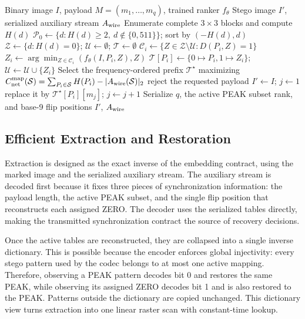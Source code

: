 \begin{algorithm*}[t]
\caption{Net-Aware CNN-Ranked Distance-One Embedding}
\label{alg:embedding}
\begin{algorithmic}[1]
\Require Binary image $I$, payload $M=(m_1,\ldots,m_q)$, trained ranker $f_\theta$
\Ensure Stego image $I'$, serialized auxiliary stream $A_{\rm wire}$
\State Enumerate complete $3\times3$ blocks and compute $H(d)$
\State $\mathcal P_0\gets\{d:H(d)\ge2,\ d\notin\{0,511\}\}$; sort by $(-H(d),d)$
\State $\mathcal Z\gets\{d:H(d)=0\}$; $\mathcal U\gets\emptyset$; $\mathcal T\gets\emptyset$
    \State $\mathcal C_i\gets\{Z\in\mathcal Z\setminus\mathcal U:D(P_i,Z)=1\}$
        \State $Z_i\gets\arg\min_{Z\in\mathcal C_i}(f_\theta(I,P_i,Z),Z)$
        \State $\mathcal T[P_i]\gets\{0\mapsto P_i,1\mapsto Z_i\}$;
        $\mathcal U\gets\mathcal U\cup\{Z_i\}$
    \EndIf
\EndFor
\State Select the frequency-ordered prefix $\mathcal T^\star$ maximizing
\RevisionAddBegin
$C_{\rm net}^{\rm map}(\mathcal S)=
\sum_{P_i\in\mathcal S}H(P_i)-|A_{\rm wire}(\mathcal S)|_2$
\RevisionAddEnd
{}
    \State reject the requested payload
\EndIf
\State $I'\gets I$; $j\gets1$
        \State replace it by $\mathcal T^\star[P_i][m_j]$; $j\gets j+1$
    \EndIf
\EndFor
\State Serialize $q$, the active PEAK subset rank, and base-9 flip positions
\State \Return $I'$, $A_{\rm wire}$
\end{algorithmic}
\end{algorithm*}

\subsection{Efficient Extraction and Restoration}
\RevisionAddBegin
Extraction is designed as the exact inverse of the embedding contract, using
the marked image and the serialized auxiliary stream. The auxiliary stream
is decoded first because it fixes three pieces of synchronization information:
the payload length, the active PEAK subset, and the single flip position that
reconstructs each assigned ZERO. The decoder uses the serialized tables
directly, making the transmitted synchronization contract the source of
recovery decisions.

Once the active tables are reconstructed, they are collapsed into a single
inverse dictionary. This is possible because the encoder enforces global
injectivity: every stego pattern used by the codec belongs to at most one active
mapping. Therefore, observing a PEAK pattern decodes bit 0 and restores the same
PEAK, while observing its assigned ZERO decodes bit 1 and is also restored to
the PEAK. Patterns outside the dictionary are copied unchanged. This dictionary
view turns extraction into one linear raster scan with constant-time lookup.

